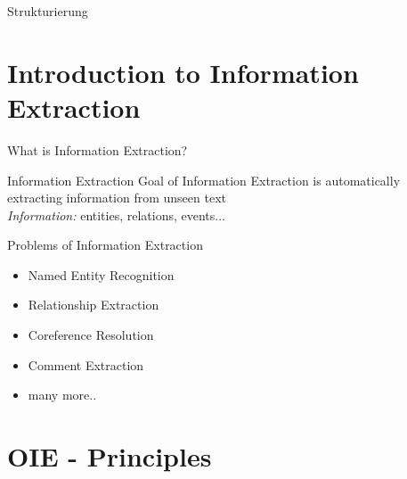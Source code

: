 \documentclass[11pt]{beamer}
\begin{document}
\begin{frame}{Strukturierung}
    \tableofcontents
\end{frame}

\section{Introduction to Information Extraction}
	\begin{frame}{What is Information Extraction?}
			\begin{center}
			\begin{block}{Information Extraction}
				Goal of Information Extraction is automatically extracting information from unseen text\\
				\textit{Information:} entities, relations, events...\\
				\end{block}
				\vspace{15pt}
			\end{center}
	\end{frame}
	\begin{frame}{Problems of Information Extraction}
				\begin{center}
				\begin{itemize}
					\item Named Entity Recognition
					\item Relationship Extraction 
					\item Coreference Resolution
					\item Comment Extraction
					\item many more..
					\end{itemize}
				\end{center}
	\end{frame}
\section{OIE - Principles}
\end{document}
